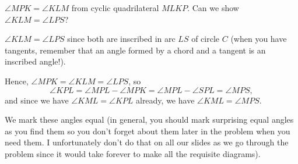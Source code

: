 





$\angle MPK = \angle KLM$ from cyclic quadrilateral $MLKP$. Can we show $\angle KLM = \angle LPS$?







$\angle KLM = \angle LPS$ since both are inscribed in arc $LS$ of circle $C$ (when you have tangents, remember that an angle formed by a chord and a tangent is an inscribed angle!).

Hence, $\angle MPK = \angle KLM = \angle LPS$, so
$$ \angle KPL = \angle MPL - \angle MPK = \angle MPL - \angle SPL = \angle MPS, $$ and since we have $\angle KML = \angle KPL$ already, we have $\angle KML = \angle MPS.$

We mark these angles equal (in general, you should mark surprising equal angles as you find them so you don't forget about them later in the problem when you need them. I unfortunately don't do that on all our slides as we go through the problem since it would take forever to make all the requisite diagrams).

